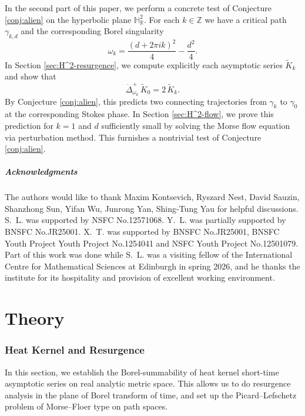 \documentclass[11pt]{amsart}
\theoremstyle{plain}
\theoremstyle{definition}
\newcommand{\R}{\mathbb{R}}
\newcommand{\Z}{\mathbb Z}
\newcommand{\HH}{\mathbb{H}}
\begin{document}
In the second part of this paper, we perform a concrete test of Conjecture \ref{conj:alien} on the hyperbolic plane $\HH_{\R}^2$. For each $k\in \Z$ we have a critical path $\gamma_{{k},d}$ and the corresponding Borel singularity 
$$
\omega_k=\frac{(d+2\pi i k)^2}{4}-\frac{d^2}{4}. 
$$
In Section \ref{sec:H^2-resurgence}, we compute explicitly each asymptotic series $\widetilde K_k$ and show that
\[
\dot\Delta_{\omega_k}^{+}\,\widetilde{K}_0
=2\,\widetilde{K}_k.
\]
By Conjecture \ref{conj:alien}, this predicts two connecting trajectories from $\gamma_k$ to $\gamma_0$ at the corresponding Stokes phase. In Section \ref{sec:H^2-flow}, we prove this prediction for $k=1$ and $d$ sufficiently small by solving the Morse flow equation via perturbation method. This furnishes a nontrivial test of Conjecture \ref{conj:alien}. 

\smallskip
\subsubsection*{Acknowledgments}

The authors would like to thank Maxim Kontsevich, Ryszard Nest, David Sauzin, Shanzhong Sun, Yifan Wu, Junrong Yan, Shing-Tung Yau for helpful discussions. S.~L. was supported by NSFC No.12571068.  Y.~L. was partially supported by BNSFC No.JR25001.  X.~T. was supported by BNSFC No.JR25001, BNSFC Youth Project Youth Project No.1254041 and NSFC Youth Project No.12501079. Part of this work was done while S.~L. was a visiting fellow of the International Centre for Mathematical Sciences  at Edinburgh in spring 2026, and he thanks the institute for its hospitality and provision of excellent working environment.

\part{Theory}

\section{Heat Kernel and Resurgence}\label{sec:heat-resurgence}

In this section, we establish the Borel-summability of heat kernel short-time asymptotic series on real analytic metric space. This allows us to do resurgence analysis in the plane of Borel transform of time, and set up the Picard–Lefschetz problem of Morse–Floer type on path spaces. 
\end{document}

